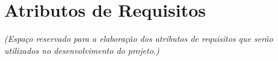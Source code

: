 \section{Atributos de Requisitos}
	\textit{(Espaço reservado para a elaboração dos atributos de requisitos que serão utilizados no desenvolvimento do projeto.)}
